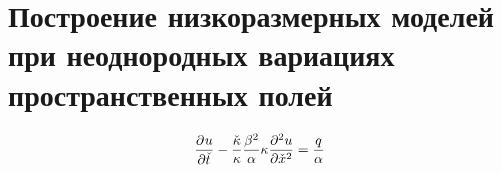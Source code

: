 \chapter{Построение низкоразмерных моделей при неоднородных вариациях пространственных полей}\label{ch:ch4}



\begin{align}
    \deriv{u}{\check{t}}
    - \frac{\check{\kappa}}{\kappa}
    \frac{\beta^2}{\alpha}  \kappa \deriv[2]{u}{\check{x}} = \frac{q}{\alpha}
\end{align}

\begin{figure}[ht]
    \caption{~\cite{Elizarev2022}}\label{fig:q-domains}
\end{figure}

\begin{figure}[ht]
    \caption{~\cite{Elizarev2022}}\label{fig:q-domains}
\end{figure}
